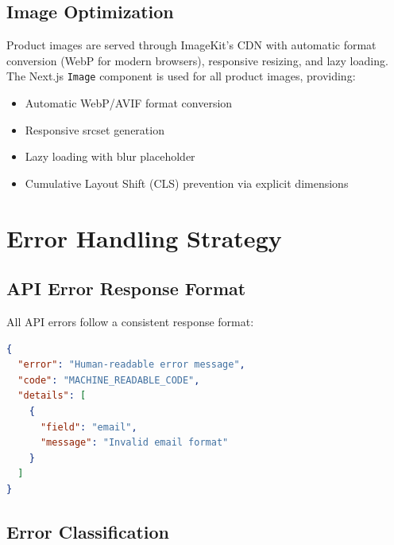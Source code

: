 \documentclass[12pt,a4paper]{report}
\begin{document}
\subsection{Image Optimization}

Product images are served through ImageKit's CDN with automatic format conversion (WebP for modern browsers), responsive resizing, and lazy loading. The Next.js \texttt{Image} component is used for all product images, providing:
\begin{itemize}[leftmargin=1.5em]
  \item Automatic WebP/AVIF format conversion
  \item Responsive srcset generation
  \item Lazy loading with blur placeholder
  \item Cumulative Layout Shift (CLS) prevention via explicit dimensions
\end{itemize}

\section{Error Handling Strategy}

\subsection{API Error Response Format}

All API errors follow a consistent response format:

\begin{lstlisting}[language=JSON,caption={Standard error response format}]
{
  "error": "Human-readable error message",
  "code": "MACHINE_READABLE_CODE",
  "details": [
    {
      "field": "email",
      "message": "Invalid email format"
    }
  ]
}
\end{lstlisting}

\subsection{Error Classification}
\end{document}
